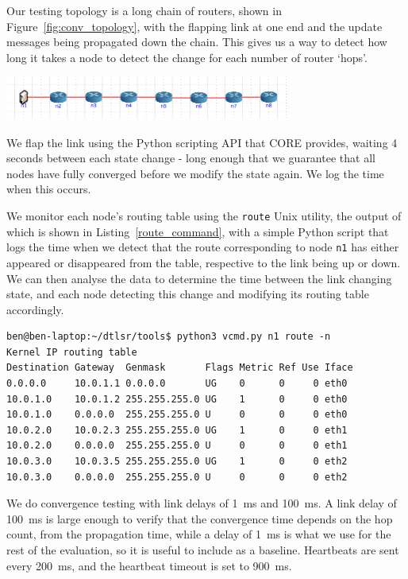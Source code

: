 \documentclass[withindex,glossary,openany]{cam-thesis}
\begin{document}
Our testing topology is a long chain of routers, shown in Figure~\ref{fig:conv_topology}, with the flapping link at one end and the update messages being propagated down the chain. This gives us a way to detect how long it takes a node to detect the change for each number of router `hops'.

\begin{minipage}{1\textwidth} \centering
	\includegraphics[width=0.7\textwidth]{conv_topology}
	\label{fig:conv_topology}
\end{minipage}

We flap the link using the Python scripting API that CORE provides, waiting 4 seconds between each state change - long enough that we guarantee that all nodes have fully converged before we modify the state again. We log the time when this occurs.

We monitor each node's routing table using the \texttt{route} Unix utility, the output of which is shown in Listing~\ref{route_command}, with a simple Python script that logs the time when we detect that the route corresponding to node \texttt{n1} has either appeared or disappeared from the table, respective to the link being up or down. We can then analyse the data to determine the time between the link changing state, and each node detecting this change and modifying its routing table accordingly.

\begin{lstlisting}[label=route_command, caption=Example routing table of virtualised node, frame=tb]
ben@ben-laptop:~/dtlsr/tools$ python3 vcmd.py n1 route -n
Kernel IP routing table
Destination Gateway  Genmask       Flags Metric Ref Use Iface
0.0.0.0     10.0.1.1 0.0.0.0       UG    0      0     0 eth0
10.0.1.0    10.0.1.2 255.255.255.0 UG    1      0     0 eth0
10.0.1.0    0.0.0.0  255.255.255.0 U     0      0     0 eth0
10.0.2.0    10.0.2.3 255.255.255.0 UG    1      0     0 eth1
10.0.2.0    0.0.0.0  255.255.255.0 U     0      0     0 eth1
10.0.3.0    10.0.3.5 255.255.255.0 UG    1      0     0 eth2
10.0.3.0    0.0.0.0  255.255.255.0 U     0      0     0 eth2
\end{lstlisting}

We do convergence testing with link delays of \SI{1}{\ms} and \SI{100}{\ms}. A link delay of \SI{100}{\ms} is large enough to verify that the convergence time depends on the hop count, from the propagation time, while a delay of \SI{1}{\ms} is what we use for the rest of the evaluation, so it is useful to include as a baseline.  Heartbeats are sent every \SI{200}{\ms}, and the heartbeat timeout is set to \SI{900}{\ms}.
\end{document}
